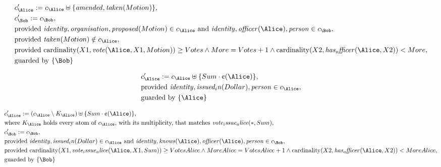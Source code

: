 \begin{align*}
&
c'_
{
\Alice
}
 := 
c_
{
\Alice
}
 \uplus 
\{
\mathit{
amended
}
,
\mathit{
taken
}
(
Motion
)
\}
,\\
&
c'_
{
\Bob
}
 := 
c_
{
\Bob
}
,\\
&
\text{provided } 
\mathit{
identity
}
,
\mathit{
organisation
}
,
\mathit{
proposed
}
(
Motion
)
 \in c_
{
\Alice
}
 \text{ and } 
\mathit{
identity
}
,
\mathit{
officer
}
(
\Alice
)
,
\mathit{
person
}
 \in c_
{
\Bob
}
,\\
&
\text{provided } 
\mathit{
taken
}
(
Motion
)
 \notin c_
{
\Alice
}
,\\
&
\text{provided } 
\mathrm{cardinality}(
X1
,
\mathit{
vote
}
(
\Alice
,
X1
,
Motion
)
)
\ge
Votes
\land
More
=
Votes
+
1
\land
\mathrm{cardinality}(
X2
,
\mathit{
has_officer
}
(
\Alice
,
X2
)
)
<
More
,\\
&
\text{guarded by } \{
\Bob
\}
\end{align*}

\begin{align*}
&
c'_
{
\Alice
}
 := 
c_
{
\Alice
}
 \uplus 
\{
Sum
\cdot
\text{\textcent}
(
\Alice
)
\}
,\\
&
\text{provided } 
\mathit{
identity
}
,
\mathit{
issued_in
}
(
Dollar
)
,
\mathit{
person
}
 \in c_
{
\Alice
}
,\\
&
\text{guarded by } \{
\Alice
\}
\end{align*}

\begin{align*}
&
c'_
{
\Alice
}
 := 
(
c_
{
\Alice
}
 \setminus K_
{
\Alice
}
) \uplus 
\{
Sum
\cdot
\text{\textcent}
(
\Alice
)
\}
,\\
&
\text{where } K_
{
\Alice
}
 \text{ holds every atom of } c_
{
\Alice
}
 \text{, with its multiplicity, that matches } 
\mathit{
vote_issue_alice
}
(
\ast
,
Sum
)
,\\
&
c'_
{
\Bob
}
 := 
c_
{
\Bob
}
,\\
&
\text{provided } 
\mathit{
identity
}
,
\mathit{
issued_in
}
(
Dollar
)
 \in c_
{
\Alice
}
 \text{ and } 
\mathit{
identity
}
,
\mathit{
knows
}
(
\Alice
)
,
\mathit{
officer
}
(
\Alice
)
,
\mathit{
person
}
 \in c_
{
\Bob
}
,\\
&
\text{provided } 
\mathrm{cardinality}(
X1
,
\mathit{
vote_issue_alice
}
(
\Alice
,
X1
,
Sum
)
)
\ge
VotesAlice
\land
MoreAlice
=
VotesAlice
+
1
\land
\mathrm{cardinality}(
X2
,
\mathit{
has_officer
}
(
\Alice
,
X2
)
)
<
MoreAlice
,\\
&
\text{guarded by } \{
\Bob
\}
\end{align*}
